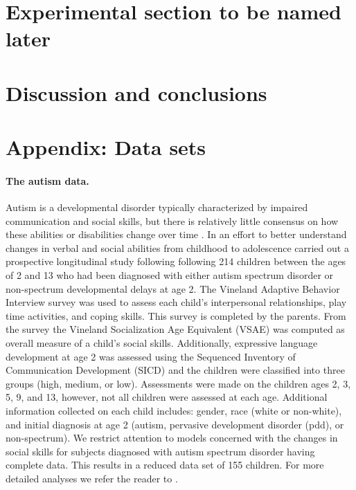 \documentclass{article} %
\begin{document}
\section{Experimental section to be named later}


\section{Discussion and conclusions}


\section{Appendix: Data sets}

\paragraph{The autism data.}

Autism is a developmental disorder typically characterized by impaired communication and social skills, but there is relatively little consensus on how these abilities or disabilities change over time \citep{Anderson:2007cl, Anderson:2009in}. In an effort to better understand changes in verbal and social abilities from childhood to adolescence \cite{Anderson:2007cl, Anderson:2009in} carried out a prospective longitudinal study following following 214 children between the ages of 2 and 13 who had been diagnosed with either autism spectrum disorder or non-spectrum developmental delays at age 2. 
The Vineland Adaptive Behavior Interview survey was used to assess each child's interpersonal relationships, play time activities, and coping skills. This survey is completed by the parents. From the survey the Vineland Socialization Age Equivalent (VSAE) was computed as overall measure of a child's social skills. Additionally, expressive language development at age 2 was assessed using the Sequenced Inventory of Communication Development (SICD) and the children were classified into three groups (high, medium, or low). Assessments were made on the children ages 2, 3, 5, 9, and 13, however, not all children were assessed at each age. Additional information collected on each child includes: gender, race (white or non-white), and initial diagnosis at age 2 (autism, pervasive development disorder (pdd), or non-spectrum). We restrict attention to models concerned with the changes in social skills for subjects diagnosed with autism spectrum disorder having complete data. This results in a reduced data set of 155 children. For more detailed analyses we refer the reader to \cite{Anderson:2007cl, Anderson:2009in}.





\end{document}
